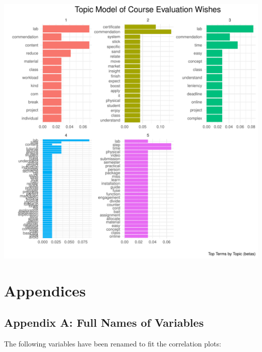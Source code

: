 \documentclass[
]{article}
\begin{document}
\includegraphics{AnalysisOfCourseEvaluation-Notebook_files/figure-latex/visualizations_for_wishes_topic_modelling-1.pdf}

\newpage

\section{Appendices}\label{appendices}

\subsection{Appendix A: Full Names of
Variables}\label{appendix-a-full-names-of-variables}

The following variables have been renamed to fit the correlation plots:
\end{document}
